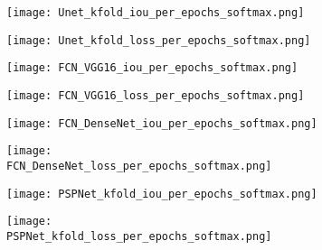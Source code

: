 \begin{figure} [!h]
	\centering
	\begin{subfigure}[b]{0.47\textwidth}
		\centering		\texttt{[image: Unet\_kfold\_iou\_per\_epochs\_softmax.png]}	\caption{}
		\label{fig:unet_accuracy_metric}
	\end{subfigure}
	\hfill	
	\begin{subfigure}[b]{0.47\textwidth}
		\centering
		\texttt{[image: Unet\_kfold\_loss\_per\_epochs\_softmax.png]}
		\caption{}
		\label{fig:unet_loss_metric}
	\end{subfigure}
	\hfill
	\begin{subfigure}[b]{0.47\textwidth}
		\centering
		\texttt{[image: FCN\_VGG16\_iou\_per\_epochs\_softmax.png]}
		\caption{}
		\label{fig:vgg16_accuracy_metric}
	\end{subfigure}		
	\hfill
	\begin{subfigure}[b]{0.47\textwidth}
		\centering
		\texttt{[image: FCN\_VGG16\_loss\_per\_epochs\_softmax.png]}
		\caption{}
		\label{fig:vgg16_loss_metric}
	\end{subfigure}
	\hfill
	\begin{subfigure}[b]{0.49\textwidth}
		\centering
		\texttt{[image: FCN\_DenseNet\_iou\_per\_epochs\_softmax.png]}
		\caption{}
		\label{fig:fcn_densenet_accuracy_metric}
	\end{subfigure}
	\hfill
	\begin{subfigure}[b]{0.49\textwidth}
		\centering
		\texttt{[image: FCN\_DenseNet\_loss\_per\_epochs\_softmax.png]}
		\caption{}
		\label{fig:fcn_densenet_loss_metric}
	\end{subfigure}
	\hfill
	\begin{subfigure}[b]{0.49\textwidth}
		\centering
		\texttt{[image: PSPNet\_kfold\_iou\_per\_epochs\_softmax.png]}
		\caption{}
		\label{fig:psp_accuracy_metric}
	\end{subfigure}
	\hfill
	\begin{subfigure}[b]{0.47\textwidth}
		\centering
		\texttt{[image: PSPNet\_kfold\_loss\_per\_epochs\_softmax.png]}
		\caption{}
		\label{fig:psp_loss_metric}
	\end{subfigure}

\end{figure}
